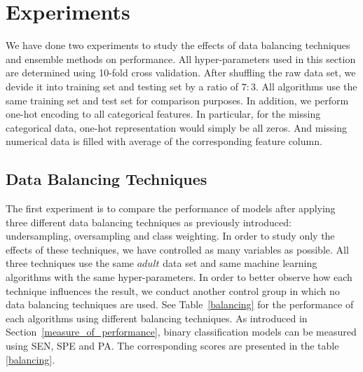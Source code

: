 \documentclass{article}
\begin{document}
\section{Experiments}
\label{experiments}

We have done two experiments to study the effects of data balancing techniques and ensemble methods on performance. All hyper-parameters used in this section are determined using 10-fold cross validation. After shuffling the raw data set, we devide it into training set and testing set by a ratio of $7:3$. All algorithms use the same training set and test set for comparison purposes. In addition, we perform one-hot encoding to all categorical features. In particular, for the missing categorical data, one-hot representation would simply be all zeros. And missing numerical data is filled with average of the corresponding feature column.

\subsection{Data Balancing Techniques}
\label{balancing_experiment}

The first experiment is to compare the performance of models after applying three different data balancing techniques as previously introduced: undersampling, oversampling and class weighting. In order to study only the effects of these techniques, we have controlled as many variables as possible. All three techniques use the same $adult$ data set and same machine learning algorithms with the same hyper-parameters. In order to better observe how each technique influences the result, we conduct another control group in which no data balancing techniques are used. See Table~\ref{balancing} for the performance of each algorithms using different balancing techniques. As introduced in Section~\ref{measure_of_performance}, binary classification models can be measured using SEN, SPE and PA. The corresponding scores are presented in the table \ref{balancing}. \\
\end{document}
